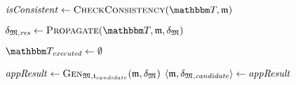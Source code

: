 \begin{algorithmic}[1]
    \algindentskip
    \State $\mathvariable{isConsistent} \gets \function{CheckConsistency}(\transformationset{T}, \modeltuple{m})$
        \State \Return{$\bot$} \label{algo:orchestration:provenance:line:bot_input}
    \EndIf
    \algblockskip

    \State $\changetuple{\metamodeltuple{M},\mathvariable{res}} \gets \function{Propagate}(\transformationset{T}, \modeltuple{m}, \changetuple{\metamodeltuple{M}})$
        \State \Return{$\bot$} \label{algo:orchestration:provenance:line:bot_orchestration}
    \EndIf
    \algblockskip

    \State {} %
    \label{algo:orchestration:provenance:line:return_result}
    \algindentskip
\EndProcedure
\vspace{0.5\baselineskip}

    \algindentskip
    \State $\provalgexecuted \gets \emptyset$ \label{algo:orchestration:provenance:line:executed_init}
    \algblockskip

     \label{algo:orchestration:provenance:line:loop_start}
        \algindentskip
        \State $\mathit{appResult} \gets \textsc{Gen}_{\mathfrak{M}, \mathfrak{t}_{candidate}}(\mathfrak{m}, \mathfrak{\delta}_{\mathfrak{M}})$ \label{algo:orchestration:provenance:line:first_execution}
            \State \Return{$\bot$} \label{algo:orchestration:provenance:line:bot_application}
        \EndIf
        \State $\langle \mathfrak{m}, \mathfrak{\delta}_{\mathfrak{M},\mathit{candidate}} \rangle \gets \mathit{appResult}$
        \algblockskip


\end{algorithmic}
